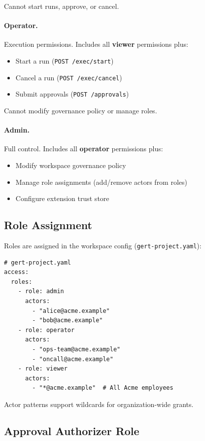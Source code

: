 Cannot start runs, approve, or cancel.

\paragraph{Operator.}
Execution permissions.  Includes all \textbf{viewer} permissions plus:

\begin{itemize}
  \item Start a run (\texttt{POST /exec/start})
  \item Cancel a run (\texttt{POST /exec/cancel})
  \item Submit approvals (\texttt{POST /approvals})
\end{itemize}

Cannot modify governance policy or manage roles.

\paragraph{Admin.}
Full control.  Includes all \textbf{operator} permissions plus:

\begin{itemize}
  \item Modify workspace governance policy
  \item Manage role assignments (add/remove actors from roles)
  \item Configure extension trust store
\end{itemize}

\subsection{Role Assignment}

Roles are assigned in the workspace config (\texttt{gert-project.yaml}):

\begin{verbatim}
# gert-project.yaml
access:
  roles:
    - role: admin
      actors:
        - "alice@acme.example"
        - "bob@acme.example"
    - role: operator
      actors:
        - "ops-team@acme.example"
        - "oncall@acme.example"
    - role: viewer
      actors:
        - "*@acme.example"  # All Acme employees
\end{verbatim}

Actor patterns support wildcards for organization-wide grants.

\subsection{Approval Authorizer Role}


